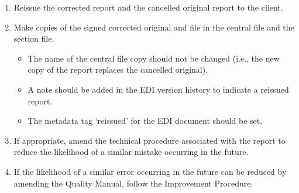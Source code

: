 \begin{enumerate}
\item Reissue the corrected report and the cancelled original report to the client.

\item Make copies of the signed corrected original and file in the central file and the section file. 
\begin{itemize}
\item The name of the central file copy should not be changed (i.e., the new copy of the report replaces the cancelled original). 
\item A note should be added in the EDI version history to indicate a reissued report.
\item The metadata tag ‘reissued’ for the EDI document should be set.
\end{itemize}

\item If appropriate, amend the technical procedure associated with the report to reduce the likelihood of a similar mistake occurring in the future.

\item If the likelihood of a similar error occurring in the future can be reduced by amending the Quality Manual, follow the Improvement Procedure.  
\end{enumerate}

